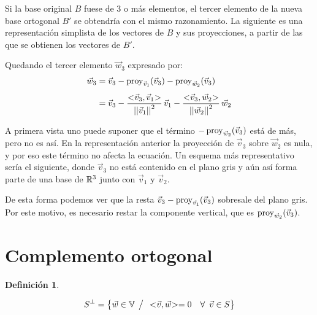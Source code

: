 \documentclass[a5paper,12pt,twoside]{book}
\newtheorem{defn}{{Definición}}[chapter]
\begin{document}
Si la base original $B$ fuese de 3 o más elementos, el tercer elemento de la nueva base ortogonal $B'$ se obtendría con el mismo razonamiento. La siguiente es una representación simplista de los vectores de $B$ y sus proyecciones, a partir de las que se obtienen los vectores de $B'$.

\begin{center}
\end{center}

Quedando el tercer elemento $\Vec{w}_3$ expresado por:
\begin{align*}
    \Vec{w}_3 &= \Vec{v}_3 - \operatorname{proy}_{\Vec{v}_1}(\Vec{v}_3) - \operatorname{proy}_{\Vec{w}_2}(\Vec{v}_3)
    \\[1ex]
    &= \Vec{v}_3 - \frac{<\hspace{-0.8mm}\Vec{v}_3,\Vec{v}_1\hspace{-0.8mm}>}{{\left|\left| {\Vec{v}_1} \right|\right|}^2} \, \Vec{v}_1 - \frac{<\hspace{-0.8mm}\Vec{v}_3,\Vec{w}_2\hspace{-0.8mm}>}{{\left|\left| {\Vec{w}_2} \right|\right|}^2} \, \Vec{w}_2
\end{align*}

A primera vista uno puede suponer que el término $-\operatorname{proy}_{\Vec{w}_2}(\Vec{v}_3)$ está de más, pero no es así. En la representación anterior la proyección de $\Vec{v}_3$ sobre $\Vec{w}_2$ es nula, y por eso este término no afecta la ecuación. Un esquema más representativo sería el siguiente, donde $\Vec{v}_3$ no está contenido en el plano gris y aún así forma parte de una base de $\mathbb{R}^3$ junto con $\Vec{v}_1$ y $\Vec{v}_2$.

\begin{center}
\end{center}

De esta forma podemos ver que la resta $\Vec{v}_3-\operatorname{proy}_{\Vec{v}_1}(\Vec{v}_3)$ sobresale del plano gris. Por este motivo, es necesario restar la componente vertical, que es $\operatorname{proy}_{\Vec{w}_2}(\Vec{v}_3)$.


\section{Complemento ortogonal}

\begin{mdframed}[style=MyFrame1]
    \begin{defn}
        \label{defn:compOrto}
    \end{defn}
    \begin{equation*}
        S^\perp = { \left\{ {\Vec{w} \in \mathbb{V} \hspace{1ex} \big/ \hspace{1ex} <\hspace{-0.8mm}\Vec{v},\Vec{w}\hspace{-0.8mm}> = 0 \quad \forall \enspace \Vec{v} \in S} \right\} }
    \end{equation*}
\end{mdframed}
\end{document}
